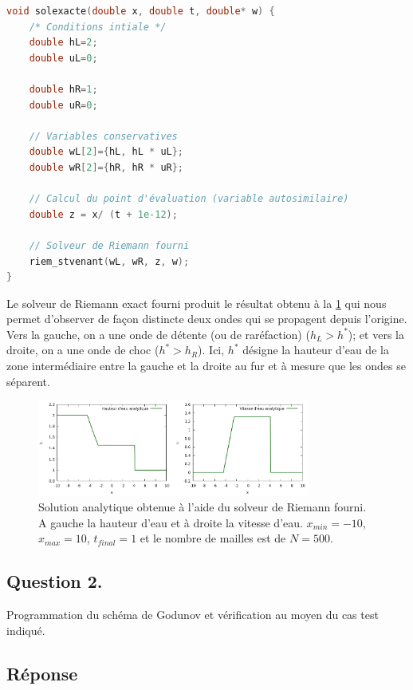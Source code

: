 \documentclass[
	french,
	11pt, %
]{fphw}
\begin{document}
\begin{lstlisting}[language=C, caption={Fonction de calcul de la solution exacte},breaklines]
void solexacte(double x, double t, double* w) {
    /* Conditions intiale */
    double hL=2;
    double uL=0;

    double hR=1;
    double uR=0;

	// Variables conservatives
    double wL[2]={hL, hL * uL};		    
    double wR[2]={hR, hR * uR};

	// Calcul du point d'évaluation (variable autosimilaire)
	double z = x/ (t + 1e-12);          
	
	// Solveur de Riemann fourni
    riem_stvenant(wL, wR, z, w);
}
\end{lstlisting}
Le solveur de Riemann exact fourni produit le résultat obtenu à la \cref{fig:SolExacte500} qui nous permet d'observer de façon distincte deux ondes qui se propagent depuis l'origine. Vers la gauche, on a une onde de détente (ou de raréfaction) ($h_L > h^\ast$); et vers la droite, on a une onde de choc ($h^\ast > h_R$). Ici, $h^\ast$ désigne la hauteur d'eau de la zone intermédiaire entre la gauche et la droite au fur et à mesure que les ondes se séparent.
\begin{figure}[h]
	\centering
	\includegraphics[width=0.8\textwidth]{SolExacte500.png}
	\caption{Solution analytique obtenue à l'aide du solveur de Riemann fourni. A gauche la hauteur d'eau et à droite la vitesse d'eau. $x_{min}=-10$, $x_{max}=10$, $t_{final} = 1$ et le nombre de mailles est de $N=500$.}
	\label{fig:SolExacte500}
\end{figure}


\subsection*{Question 2.}
\begin{problem}
	Programmation du schéma de Godunov et vérification au moyen du cas test indiqué.
\end{problem}


\subsection*{Réponse} 
\end{document}

